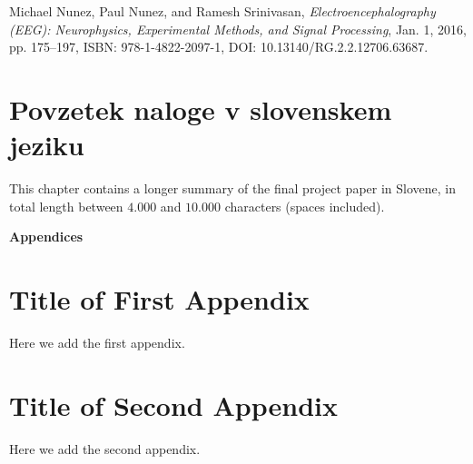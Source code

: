 \documentclass[12pt,a4paper,titlepage,openany]{report}
\begin{document}
\begin{thebibliography}{99}
\thispagestyle{fancy}
     
     Michael Nunez, Paul Nunez, and Ramesh Srinivasan, 
     \emph{Electroencephalography (EEG): Neurophysics, Experimental Methods, and Signal Processing}, 
     Jan. 1, 2016, pp. 175--197, ISBN: 978-1-4822-2097-1, DOI: 10.13140/RG.2.2.12706.63687.
     
\end{thebibliography}
\newpage


\chapter{Povzetek naloge v slovenskem jeziku}
\thispagestyle{fancy}

This chapter contains a longer summary of the final project paper in Slovene,
in total length between $4.000$ and $10.000$ characters (spaces included).


\pagestyle{fancyplain}
\vspace*{\fill}
     \begin{center}
          \bf{\Huge{Appendices}}
     \end{center}
\vspace*{\fill}
\thispagestyle{fancy}

\appendix
\thispagestyle{empty}

\chapter{Title of First Appendix}
\thispagestyle{empty}
Here we add the first appendix.


\chapter{Title of Second Appendix}
\thispagestyle{empty}
Here we add the second appendix.


\end{document}
